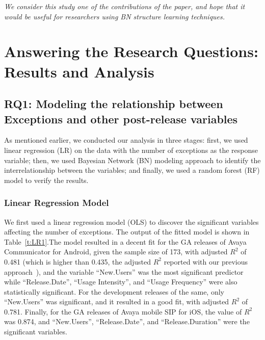 \documentclass[smallcondensed]{svjour3}     %
\begin{document}
\emph{We consider this study one of the contributions of the paper, and hope that it 
would be useful for researchers using BN structure learning techniques.}


\section{Answering the Research Questions: Results and Analysis}\label{s:result}

\subsection{RQ1: Modeling the relationship between Exceptions and other post-release variables}\label{s:explain}
As mentioned earlier, we conducted our analysis in three stages: first, we used linear regression (LR) on the data with the number of exceptions as the response variable; then, we used Bayesian Network (BN) modeling approach to identify the interrelationship between the variables; and finally, we used a random forest (RF) model to verify the results. 

\vspace{-10pt}
\subsubsection{Linear Regression Model}
We first used a linear regression model (OLS) to discover the significant variables affecting the number of exceptions. The  output  of the fitted model is shown in Table~\ref{t:LR1}.The model resulted in a decent fit for the GA releases of Avaya Communicator for Android, given the sample size of 173, with adjusted $R^2$ of 0.481 (which is higher than  0.435, the adjusted $R^2$  reported with our previous approach~\cite{dey2018modeling}), and the variable ``New.Users'' was the most significant predictor while ``Release.Date'', ``Usage Intensity'', and ``Usage Frequency'' were also statistically significant. For the development releases of the same, only ``New.Users'' was significant, and it resulted in a good fit, with adjusted $R^2$ of 0.781.
Finally, for the GA releases of Avaya mobile SIP for iOS, the value of $R^2$ was 0.874, and ``New.Users'', ``Release.Date'', and ``Release.Duration'' were the significant variables.
\end{document}
